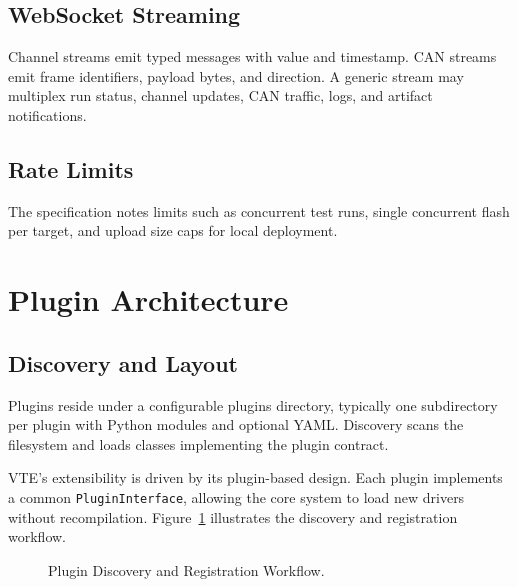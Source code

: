 \documentclass[conference]{IEEEtran}
\begin{document}
\subsection{WebSocket Streaming}
Channel streams emit typed messages with value and timestamp. CAN streams emit frame identifiers, payload bytes, and direction. A generic stream may multiplex run status, channel updates, CAN traffic, logs, and artifact notifications.

\subsection{Rate Limits}
The specification notes limits such as concurrent test runs, single concurrent flash per target, and upload size caps for local deployment.

\section{Plugin Architecture}

\subsection{Discovery and Layout}
Plugins reside under a configurable plugins directory, typically one subdirectory per plugin with Python modules and optional YAML. Discovery scans the filesystem and loads classes implementing the plugin contract.

VTE's extensibility is driven by its plugin-based design. Each plugin implements a common \texttt{PluginInterface}, allowing the core system to load new drivers without recompilation. Figure~\ref{fig:plugins} illustrates the discovery and registration workflow.

\begin{figure}[htbp]
\centering
{}
\caption{Plugin Discovery and Registration Workflow.}
\label{fig:plugins}
\end{figure}
\end{document}
